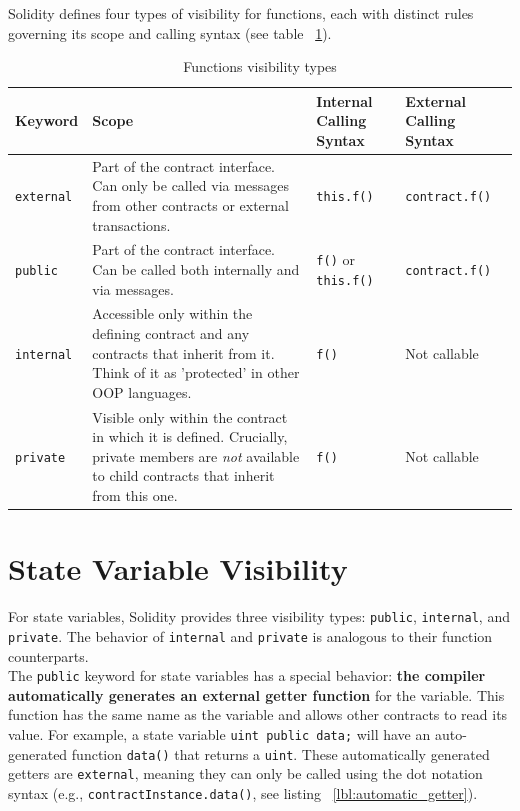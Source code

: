 \documentclass{scrbook}
\begin{document}
Solidity defines four types of visibility for functions, each with distinct rules governing its scope and calling syntax (see table ~\ref{lbl:visibility_table}).

\begin{table}[h!]
    \centering
    \begin{tabular}{|p{}|p{}|p{}|p{}|}
        \hline
        Keyword & Scope & Internal Calling Syntax & External Calling Syntax \\ \hline
        
        \texttt{external} & Part of the contract interface. Can only be called via messages from other contracts or external transactions. & \texttt{this.f()} & \texttt{contract.f()} \\ \hline
        
        \texttt{public} & Part of the contract interface. Can be called both internally and via messages. & \texttt{f()} or \texttt{this.f()} & \texttt{contract.f()} \\ \hline
        
        \texttt{internal} & Accessible only within the defining contract and any contracts that inherit from it. Think of it as 'protected' in other OOP languages. & \texttt{f()} & Not callable \\ \hline
        
        \texttt{private} & Visible only within the contract in which it is defined. Crucially, private members are \textit{not} available to child contracts that inherit from this one. & \texttt{f()} & Not callable \\ \hline
    \end{tabular}
    \caption{Functions visibility types}
    \label{lbl:visibility_table}
\end{table}

\section{State Variable Visibility}

For state variables, Solidity provides three visibility types: \texttt{public}, \texttt{internal}, and \texttt{private}. The behavior of \texttt{internal} and \texttt{private} is analogous to their function counterparts.\\

The \texttt{public} keyword for state variables has a special behavior: \textbf{the compiler automatically generates an external getter function} for the variable. This function has the same name as the variable and allows other contracts to read its value. For example, a state variable \texttt{uint public data;} will have an auto-generated function \texttt{data()} that returns a \texttt{uint}. These automatically generated getters are \texttt{external}, meaning they can only be called using the dot notation syntax (e.g., \texttt{contractInstance.data()}, see listing ~\ref{lbl:automatic_getter}).
\end{document}
